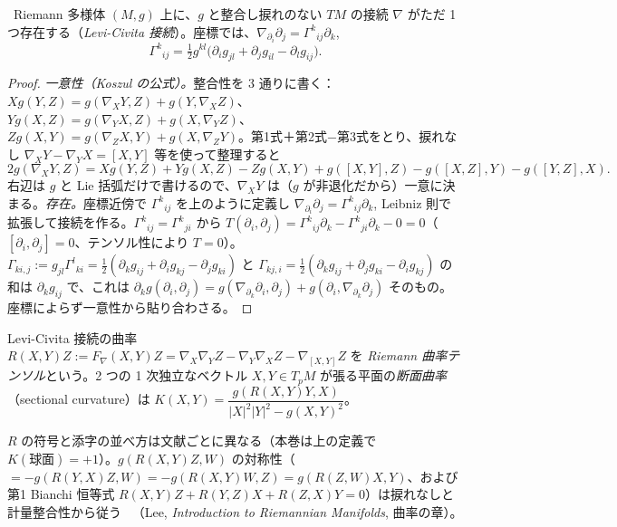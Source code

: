 \begin{thm}\label{C:thm:LC}\tP\
Riemann 多様体 $(M,g)$ 上に、$g$ と整合し捩れのない $TM$ の接続 $\nabla$ がただ 1 つ存在する（\emph{Levi-Civita 接続}）。座標では、$\nabla_{\partial_i}\partial_j=\Gamma^k{}_{ij}\partial_k$,
\[
\Gamma^k{}_{ij}=\tfrac12g^{kl}\bigl(\partial_ig_{jl}+\partial_jg_{il}-\partial_lg_{ij}\bigr).
\]
\end{thm}
\begin{proof}
\emph{一意性（Koszul の公式）。}整合性を 3 通りに書く：$Xg(Y,Z)=g(\nabla_XY,Z)+g(Y,\nabla_XZ)$、$Yg(X,Z)=g(\nabla_YX,Z)+g(X,\nabla_YZ)$、$Zg(X,Y)=g(\nabla_ZX,Y)+g(X,\nabla_ZY)$。第1式＋第2式−第3式をとり、捩れなし $\nabla_XY-\nabla_YX=[X,Y]$ 等を使って整理すると
\[
2g(\nabla_XY,Z)=Xg(Y,Z)+Yg(X,Z)-Zg(X,Y)+g([X,Y],Z)-g([X,Z],Y)-g([Y,Z],X).
\]
右辺は $g$ と Lie 括弧だけで書けるので、$\nabla_XY$ は（$g$ が非退化だから）一意に決まる。\emph{存在。}座標近傍で $\Gamma^k{}_{ij}$ を上のように定義し $\nabla_{\partial_i}\partial_j=\Gamma^k{}_{ij}\partial_k$, Leibniz 則で拡張して接続を作る。$\Gamma^k{}_{ij}=\Gamma^k{}_{ji}$ から $T(\partial_i,\partial_j)=\Gamma^k{}_{ij}\partial_k-\Gamma^k{}_{ji}\partial_k-0=0$（$[\partial_i,\partial_j]=0$、テンソル性により $T=0$）。$\Gamma_{ki,j}:=g_{jl}\Gamma^l{}_{ki}=\frac12(\partial_kg_{ij}+\partial_ig_{kj}-\partial_jg_{ki})$ と $\Gamma_{kj,i}=\frac12(\partial_kg_{ij}+\partial_jg_{ki}-\partial_ig_{kj})$ の和は $\partial_kg_{ij}$ で、これは $\partial_kg(\partial_i,\partial_j)=g(\nabla_{\partial_k}\partial_i,\partial_j)+g(\partial_i,\nabla_{\partial_k}\partial_j)$ そのもの。座標によらず一意性から貼り合わさる。
\end{proof}
\begin{defn}[Riemann 曲率]\label{C:def:Riem}
Levi-Civita 接続の曲率 $R(X,Y)Z:=F_\nabla(X,Y)Z=\nabla_X\nabla_YZ-\nabla_Y\nabla_XZ-\nabla_{[X,Y]}Z$ を \emph{Riemann 曲率テンソル}という。2 つの 1 次独立なベクトル $X,Y\in T_pM$ が張る平面の\emph{断面曲率}（sectional curvature）は $K(X,Y)=\dfrac{g(R(X,Y)Y,X)}{|X|^2|Y|^2-g(X,Y)^2}$。
\end{defn}
\begin{rem}
$R$ の符号と添字の並べ方は文献ごとに異なる（本巻は上の定義で $K(\text{球面})=+1$）。$g(R(X,Y)Z,W)$ の対称性（$=-g(R(Y,X)Z,W)=-g(R(X,Y)W,Z)=g(R(Z,W)X,Y)$、および第1 Bianchi 恒等式 $R(X,Y)Z+R(Y,Z)X+R(Z,X)Y=0$）は捩れなしと計量整合性から従う \tC\ （Lee, \emph{Introduction to Riemannian Manifolds}, 曲率の章）。
\end{rem}

